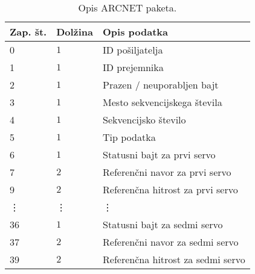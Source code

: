 
\begin{table}[h]
	\centering
	\begin{footnotesize}
		\begin{tabular}{|l l l |}
		Zap. \v{s}t. & Dol\v{z}ina & Opis podatka\\ \hline
		0 & $1$ & ID po\v{s}iljatelja\\
		1 & $1$ & ID prejemnika\\
		2 & $1$ & Prazen / neuporabljen bajt\\
		3 & $1$ & Mesto sekvencijskega \v{s}tevila\\
		4 & $1$ & Sekvencijsko \v{s}tevilo\\
		5 & $1$ & Tip podatka\\
		6 & $1$ & Statusni bajt za prvi servo\\ 
		7 & $2$ & Referen\v{c}ni navor za prvi servo\\ 
		9 & $2$ & Referen\v{c}na hitrost za prvi servo\\ 
		\vdots& \vdots &\vdots \\
		36 & $1$ & Statusni bajt za sedmi servo\\ 
		37 & $2$ & Referen\v{c}ni navor za sedmi servo\\ 
		39 & $2$ & Referen\v{c}na hitrost za sedmi servo\\ \hline
		\end{tabular}
	\end{footnotesize}
	\caption{Opis ARCNET paketa.}
	\label{table:arcnet-command}
\end{table}